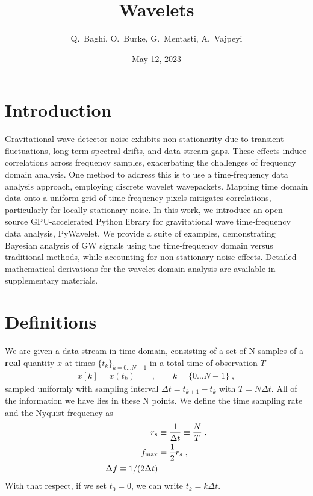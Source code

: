 \documentclass{article}
\title{Wavelets}
\author{ Q.~Baghi, O.~Burke, G.~Mentasti, A.~Vajpeyi}
\date{May 12, 2023}
\begin{document}
\maketitle

\tableofcontents


\section{Introduction}
Gravitational wave detector noise exhibits non-stationarity due to transient fluctuations, long-term spectral drifts, and data-stream gaps. 
These effects induce correlations across frequency samples, exacerbating the challenges of frequency domain analysis. 
One method to address this is to use a time-frequency data analysis approach, employing discrete wavelet wavepackets. 
Mapping time domain data onto a uniform grid of time-frequency pixels mitigates correlations, particularly for locally stationary noise. 
In this work, we introduce an open-source GPU-accelerated Python library for gravitational wave time-frequency data analysis, PyWavelet. 
We provide a suite of examples, demonstrating Bayesian analysis of GW signals using the time-frequency domain versus traditional methods, while accounting for non-stationary noise effects. Detailed mathematical derivations for the wavelet domain analysis are available in supplementary materials.


\section{Definitions}
We are given a data stream in time domain, consisting of a set of N samples of a \textbf{real} quantity $x$ at times $\{t_k\}_{k=0\dots N-1}$ in a total time of observation $T$
\begin{align}\label{st_definition}
x[k]=x(t_k)\qquad,\qquad k=\{0\dots N-1\}\;,
\end{align}
sampled uniformly with sampling interval $\Delta t = t_{k+1} - t_{k}$ with $T = N\Delta t$. All of the information we have lies in these N points. We define the time sampling rate and the Nyquist frequency as
\begin{align}
r_s&\equiv\frac{1}{\Delta t}\equiv\frac{N}{T}\;,\nonumber\\
f_{\rm max}&=\frac 1 2r_s\;,\nonumber\\
\Delta f \equiv 1/(2\Delta t)
\end{align}
With that respect, if we set $t_0=0$, we can write $t_k=k\Delta t$. 
\end{document}
